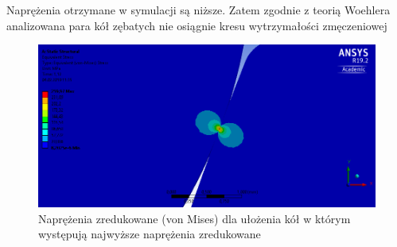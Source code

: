 Naprężenia otrzymane w symulacji są niższe.
Zatem zgodnie z teorią Woehlera analizowana para kół zębatych nie osiągnie kresu wytrzymałości zmęczeniowej


\begin{figure}[t]
	\centering
	\includegraphics[width=0.9\linewidth]{Obliczenia/von_mises_stress_przekladnia}
	\caption{Naprężenia zredukowane (von Mises) dla ułożenia kół w którym występują najwyższe naprężenia zredukowane} 
	\label{fig::stress_von_mises_przekladnia}
\end{figure}